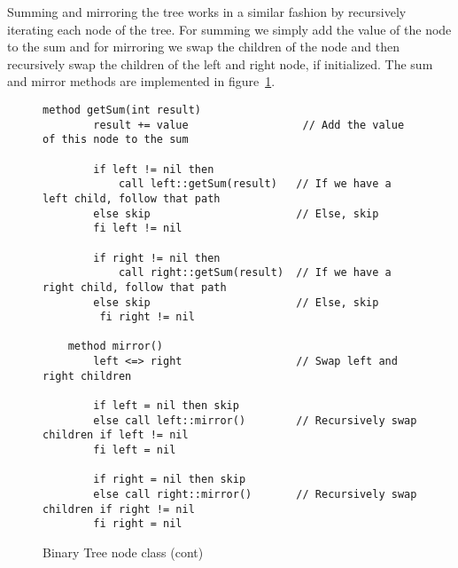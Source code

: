 Summing and mirroring the tree works in a similar fashion by recursively iterating each node of the tree. For summing we simply add the value of the node to the sum and for mirroring we swap the children of the node and then recursively swap the children of the left and right node, if initialized. The sum and mirror methods are implemented in figure~\ref{fig:binary-tree-node-class-cont}.

\begin{figure}[ht!]
    \centering
    \begin{lstlisting}[style = basic, language = roopl] 
    method getSum(int result)
        result += value                  // Add the value of this node to the sum   

        if left != nil then
            call left::getSum(result)   // If we have a left child, follow that path
        else skip                       // Else, skip
        fi left != nil

        if right != nil then
            call right::getSum(result)  // If we have a right child, follow that path
        else skip                       // Else, skip
         fi right != nil

    method mirror()
        left <=> right                  // Swap left and right children

        if left = nil then skip
        else call left::mirror()        // Recursively swap children if left != nil
        fi left = nil

        if right = nil then skip
        else call right::mirror()       // Recursively swap children if right != nil
        fi right = nil 
    \end{lstlisting}
    \caption{Binary Tree node class (cont)}
    \label{fig:binary-tree-node-class-cont}
\end{figure}

